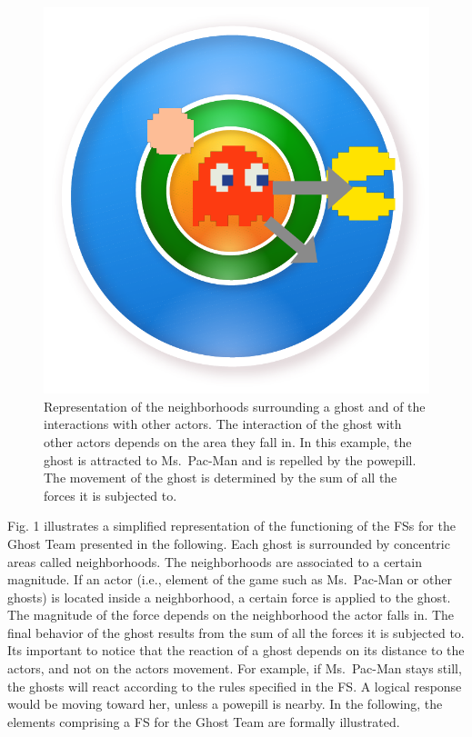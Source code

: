 \documentclass[journal]{IEEEtran}
\begin{document}
\begin{figure}[!t]
  \label{fig:Neigh_interaction}
  \centering
  \includegraphics[scale=0.5]{"neigh_inter"}
  \caption{Representation of the neighborhoods surrounding a ghost and of the interactions with other actors. The interaction of the ghost with other actors depends on the area they fall in. In this example, the ghost is attracted to Ms.\ Pac-Man and is repelled by the powepill. The movement of the ghost is determined by the sum of all the forces it is subjected to.}
\end{figure}

Fig. 1 illustrates a simplified representation of the functioning of the FSs for the Ghost Team presented in the following. Each ghost is surrounded by concentric areas called neighborhoods. The neighborhoods are associated to a certain magnitude. If an actor (i.e., element of the game such as Ms.\ Pac-Man or other ghosts) is located inside a neighborhood, a certain force is applied to the ghost. The magnitude of the force depends on the neighborhood the actor falls in. The final behavior of the ghost results from the sum of all the forces it is subjected to. Its important to notice that the reaction of a ghost depends on its distance to the actors, and not on the actors movement. For example, if Ms.\ Pac-Man stays still, the ghosts will react according to the rules specified in the FS. A logical response would be moving toward her, unless a powepill is nearby. In the following, the elements comprising a FS for the Ghost Team are formally illustrated.
\end{document}
